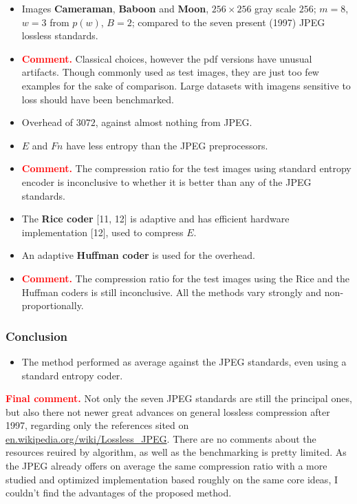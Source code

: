\documentclass[10pt, twoside, twocolumn]{paper} %
\begin{document}
\begin{itemize}[noitemsep]
  \item Images \textbf{Cameraman}, \textbf{Baboon} and \textbf{Moon}, $256\times256$ gray scale $256$; $m=8$, $w=3$ from $p(w)$, $B=2$; compared to the seven present (1997) JPEG lossless standards.
  \item\textcolor{red}{\textbf{Comment.}} Classical choices, however the pdf versions have unusual artifacts. Though commonly used as test images, they are just too few examples for the sake of comparison. Large datasets with imagens sensitive to loss should have been benchmarked.
  \item Overhead of $3072$, against almost nothing from JPEG.
  \item $E$ and $Fn$ have less entropy than the JPEG preprocessors.
  \item\textcolor{red}{\textbf{Comment.}} The compression ratio for the test images using standard entropy encoder is inconclusive to whether it is better than any of the JPEG standards.
  \item The \textbf{Rice coder} [11, 12] is adaptive and has efficient hardware implementation [12], used to compress $E$.
  \item An adaptive \textbf{Huffman coder} is used for the overhead.
  \item\textcolor{red}{\textbf{Comment.}} The compression ratio for the test images using the Rice and the Huffman coders is still inconclusive. All the methods vary strongly and non-proportionally.
\end{itemize}

\subsubsection*{Conclusion}

\begin{itemize}[noitemsep]
  \item The method performed as average against the JPEG standards, even using a standard entropy coder.
\end{itemize}

\textcolor{red}{\textbf{Final comment.}} Not only the seven JPEG standards are still the principal ones, but also there not newer great advances on general lossless compression after 1997, regarding only the references sited on \href{https://en.wikipedia.org/wiki/Lossless_JPEG}{en.wikipedia.org/wiki/Lossless\_JPEG}. There are no comments about the resources reuired by algorithm, as well as the benchmarking is pretty limited. As the JPEG already offers on average the same compression ratio with a more studied and optimized implementation based roughly on the same core ideas, I couldn't find the advantages of the proposed method.
\end{document}
